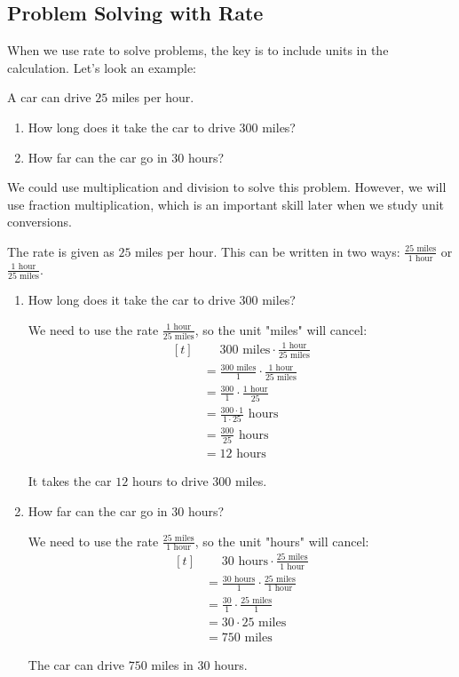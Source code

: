\subsection{Problem Solving with Rate}
When we use rate to solve problems, the key is to include units in the calculation. Let's look an example:

\begin{myexample}
A car can drive $25$ miles per hour.
\begin{enumerate}
\item How long does it take the car to drive $300$ miles?
\item How far can the car go in $30$ hours?
\end{enumerate}
\end{myexample}
\begin{solution}
We could use multiplication and division to solve this problem. However, we will use fraction multiplication, which is an important skill later when we study unit conversions.

The rate is given as $25$ miles per hour. This can be written in two ways: $\frac{25 \text{ miles}}{1 \text{ hour}}$ or $\frac{1 \text{ hour}}{25 \text{ miles}}$.

\begin{enumerate}
\item How long does it take the car to drive $300$ miles?

We need to use the rate $\frac{1 \text{ hour}}{25 \text{ miles}}$, so the unit "miles" will cancel:
\[
\begin{aligned}[t]
	&\phantom{{}=}300 \text{ miles} \cdot \frac{1 \text{ hour}}{25 \text{ miles}} \\
	&= \frac{300 \text{ miles}}{1} \cdot \frac{1 \text{ hour}}{25 \text{ miles}} \\
	&= \frac{300}{1} \cdot \frac{1 \text{ hour}}{25} \\
	&= \frac{300 \cdot 1}{1 \cdot 25} \text{ hours} \\
	&= \frac{300}{25} \text{ hours} \\
	&= 12 \text{ hours}
\end{aligned}
\]

It takes the car $12$ hours to drive $300$ miles.
\item How far can the car go in $30$ hours?

We need to use the rate $\frac{25 \text{ miles}}{1 \text{ hour}}$, so the unit "hours" will cancel:
\[
\begin{aligned}[t]
	&\phantom{{}=}30 \text{ hours} \cdot \frac{25 \text{ miles}}{1 \text{ hour}} \\
	&= \frac{30 \text{ hours}}{1} \cdot \frac{25 \text{ miles}}{1 \text{ hour}} \\
	&= \frac{30}{1} \cdot \frac{25 \text{ miles}}{1} \\
	&= 30 \cdot 25 \text{ miles} \\
	&= 750 \text{ miles}
\end{aligned}
\]

The car can drive $750$ miles in $30$ hours.
\end{enumerate}
\end{solution}

